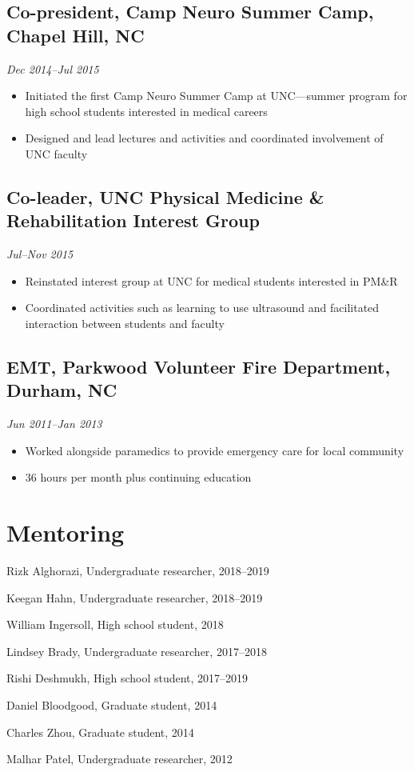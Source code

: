 \documentclass{article}
\newcommand{\dateformat}[1]{\textit{#1}}
\begin{document}
  \subsection*{Co-president, Camp Neuro Summer Camp, Chapel Hill, NC}
    \dateformat{Dec 2014--Jul 2015}
    \begin{itemize}
      \item Initiated the first Camp Neuro Summer Camp at UNC---summer program for high school students interested in medical careers
      \item Designed and lead lectures and activities and coordinated involvement of UNC faculty
    \end{itemize}

  \subsection*{Co-leader, UNC Physical Medicine \& Rehabilitation Interest Group}
    \dateformat{Jul--Nov 2015}
    \begin{itemize}
      \item Reinstated interest group at UNC for medical students interested in PM\&R
      \item Coordinated activities such as learning to use ultrasound and facilitated interaction between students and faculty
    \end{itemize}

  \subsection*{EMT, Parkwood Volunteer Fire Department, Durham, NC}
    \dateformat{Jun 2011--Jan 2013}
    \begin{itemize}
      \item Worked alongside paramedics to provide emergency care for local community
      \item 36 hours per month plus continuing education
    \end{itemize}


\section*{Mentoring}
  \begin{description}
    \item Rizk Alghorazi, Undergraduate researcher, 2018--2019
    \item Keegan Hahn, Undergraduate researcher, 2018--2019
    \item William Ingersoll, High school student, 2018
    \item Lindsey Brady, Undergraduate researcher, 2017--2018
    \item Rishi Deshmukh, High school student, 2017--2019
    \item Daniel Bloodgood, Graduate student, 2014
    \item Charles Zhou, Graduate student, 2014
    \item Malhar Patel, Undergraduate researcher, 2012
  \end{description}
\end{document}
